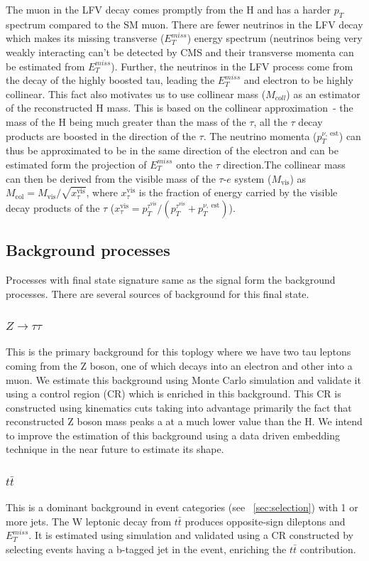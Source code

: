 \documentclass[a4paper,11pt]{article}
\begin{document}
The muon in the LFV decay comes promptly from the H and has a harder $p_{T}$ spectrum compared to the SM muon. There are fewer neutrinos in the LFV decay which makes its missing transverse ($E_{T}^{miss}$) energy spectrum (neutrinos being very weakly interacting can't be detected by CMS and their transverse momenta can be estimated from $E_{T}^{miss}$). Further, the neutrinos in the LFV process come from the decay of the highly boosted tau, leading the $E_{T}^{miss}$ and electron to be highly collinear. This fact also motivates us to use collinear mass ($M_{coll}$) as an estimator of the reconstructed H mass. This is based on the collinear approximation~\cite{h}- the mass of the H being much greater than the mass of the $\tau$, all the $\tau$ decay products are boosted in the direction of the $\tau$. The neutrino momenta ($p_{T}^{\nu,~\text{est}}$) can thus be approximated to be in the same direction of the electron and can be estimated form the projection of $E_{T}^{miss}$ onto the $\tau$ direction.The collinear mass can then be derived from the visible mass of the $\tau$-$e$ system ($M_{\text{vis}}$) as $M_{\text{col}}= M_{\text{vis}} / \sqrt{x_{\tau}^\text{vis}}$, where $x_{\tau}^\text{vis}$ is the fraction of energy carried by the visible decay products of the $\tau$ ($x_{\tau}^\text{vis}={p_{T}^{\tau^{\text{vis}}}}/{(p_{T}^{\tau^\text{vis}}+p_{T}^{\nu,~\text{est}})}$).

\subsection{Background processes}
Processes with final state signature same as the signal form the background processes. There are several sources of  background for this final state.
\subsubsection{$Z\rightarrow \tau \tau$}
This is the primary background for this toplogy where we have two tau leptons coming from the Z boson, one of which decays into an electron and other into a muon. We estimate this background using Monte Carlo simulation and validate it using a control region (CR) which is enriched in this background. This CR is constructed using kinematics cuts taking into advantage primarily the fact that reconstructed Z boson mass peaks a at a much lower value than the H. We intend to improve the estimation of this background using a data driven embedding technique in the near future to estimate its shape.
\subsubsection{$t\bar{t}$}
This is a dominant background in event categories (see ~\ref{sec:selection}) with 1 or more jets. The W leptonic decay from $t\bar{t}$ produces opposite-sign dileptons and $E_{T}^{miss}$. It is estimated using simulation and validated using a CR constructed by selecting events having a b-tagged jet in the event, enriching the $t\bar{t}$ contribution.
\end{document}
